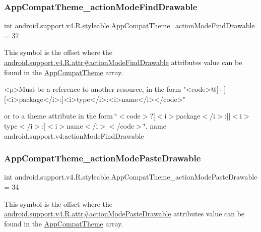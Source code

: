 \subsubsection{\texorpdfstring{App\+Compat\+Theme\+\_\+action\+Mode\+Find\+Drawable}{AppCompatTheme\_actionModeFindDrawable}}
{\footnotesize\ttfamily int android.\+support.\+v4.\+R.\+styleable.\+App\+Compat\+Theme\+\_\+action\+Mode\+Find\+Drawable = 37\hspace{0.3cm}{\ttfamily [static]}}

This symbol is the offset where the \hyperlink{classandroid_1_1support_1_1v4_1_1R_1_1attr_a63d2cf699ee588f2dd1e167ad656db83}{android.\+support.\+v4.\+R.\+attr\#action\+Mode\+Find\+Drawable} attribute\textquotesingle{}s value can be found in the \hyperlink{classandroid_1_1support_1_1v4_1_1R_1_1styleable_ac07ebbe62ed977f6dcaadc6397840ace}{App\+Compat\+Theme} array.

\begin{DoxyVerb}      <p>Must be a reference to another resource, in the form "<code>@[+][<i>package</i>:]<i>type</i>:<i>name</i></code>"
\end{DoxyVerb}
 or to a theme attribute in the form \char`\"{}$<$code$>$?\mbox{[}$<$i$>$package$<$/i$>$\+:\mbox{]}\mbox{[}$<$i$>$type$<$/i$>$\+:\mbox{]}$<$i$>$name$<$/i$>$$<$/code$>$\char`\"{}.  name android.\+support.\+v4\+:action\+Mode\+Find\+Drawable \mbox{\label{classandroid_1_1support_1_1v4_1_1R_1_1styleable_aa4e5a97fc5aefa3e9414a786423d1a6f}} 
\subsubsection{\texorpdfstring{App\+Compat\+Theme\+\_\+action\+Mode\+Paste\+Drawable}{AppCompatTheme\_actionModePasteDrawable}}
{\footnotesize\ttfamily int android.\+support.\+v4.\+R.\+styleable.\+App\+Compat\+Theme\+\_\+action\+Mode\+Paste\+Drawable = 34\hspace{0.3cm}{\ttfamily [static]}}

This symbol is the offset where the \hyperlink{classandroid_1_1support_1_1v4_1_1R_1_1attr_a6b7c3e96ea6bb4c2290019bafb9a4aa2}{android.\+support.\+v4.\+R.\+attr\#action\+Mode\+Paste\+Drawable} attribute\textquotesingle{}s value can be found in the \hyperlink{classandroid_1_1support_1_1v4_1_1R_1_1styleable_ac07ebbe62ed977f6dcaadc6397840ace}{App\+Compat\+Theme} array.

